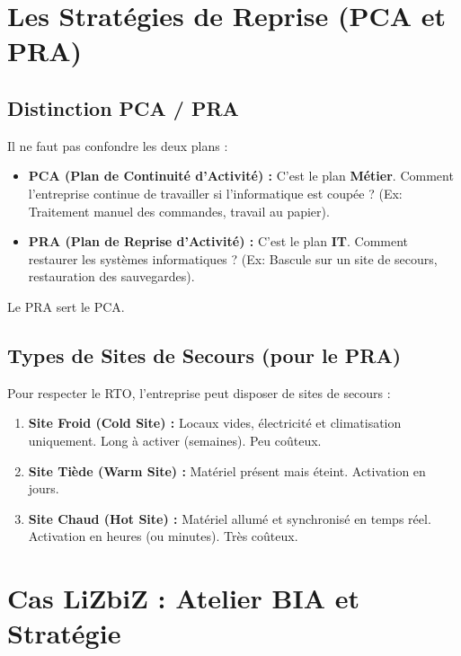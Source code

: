 \section{Les Stratégies de Reprise (PCA et PRA)}

\subsection{Distinction PCA / PRA}

Il ne faut pas confondre les deux plans :

\begin{itemize}
    \item \textbf{PCA (Plan de Continuité d'Activité) :} C'est le plan \textbf{Métier}. Comment l'entreprise continue de travailler si l'informatique est coupée ? (Ex: Traitement manuel des commandes, travail au papier).
    \item \textbf{PRA (Plan de Reprise d'Activité) :} C'est le plan \textbf{IT}. Comment restaurer les systèmes informatiques ? (Ex: Bascule sur un site de secours, restauration des sauvegardes).
\end{itemize}

Le PRA sert le PCA.

\subsection{Types de Sites de Secours (pour le PRA)}

Pour respecter le RTO, l'entreprise peut disposer de sites de secours :

\begin{enumerate}
    \item \textbf{Site Froid (Cold Site) :} Locaux vides, électricité et climatisation uniquement. Long à activer (semaines). Peu coûteux.
    \item \textbf{Site Tiède (Warm Site) :} Matériel présent mais éteint. Activation en jours.
    \item \textbf{Site Chaud (Hot Site) :} Matériel allumé et synchronisé en temps réel. Activation en heures (ou minutes). Très coûteux.
\end{enumerate}

\section{Cas LiZbiZ : Atelier BIA et Stratégie}

